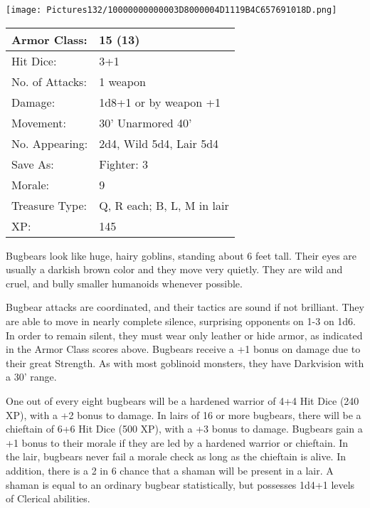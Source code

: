 \documentclass[a4paper,twoside,openany,10pt]{book}
\begin{document}
\begin{multicols}{2}
\begin{center}
\texttt{[image: Pictures132/10000000000003D8000004D1119B4C657691018D.png]}\medskip
\end{center}

\begin{center}
	\begin{tabularx}{0.48\textwidth}{@{}lX@{}}
Armor Class: & 15 (13) \\\hline
Hit Dice: & 3+1 \\\hline
No. of Attacks: & 1 weapon \\\hline
Damage: & 1d8+1 or by weapon +1 \\\hline
Movement: & 30' Unarmored 40' \\\hline
No. Appearing: & 2d4, Wild 5d4, Lair 5d4 \\\hline
Save As: & Fighter: 3 \\\hline
Morale: & 9 \\\hline
Treasure Type: & Q, R each; B, L, M in lair \\\hline
XP: & 145 \\\hline
\end{tabularx}\medskip
\end{center}

Bugbears look like huge, hairy goblins, standing about 6 feet tall. Their eyes are usually a darkish brown color and they move very quietly. They are wild and cruel, and bully smaller humanoids whenever possible. 

Bugbear attacks are coordinated, and their tactics are sound if not brilliant. They are able to move in nearly complete silence, surprising opponents on 1-3 on 1d6. In order to remain silent, they must wear only leather or hide armor, as indicated in the Armor Class scores above. Bugbears receive a +1 bonus on damage due to their great Strength. As with most goblinoid monsters, they have Darkvision with a 30' range.

One out of every eight bugbears will be a hardened warrior of 4+4 Hit Dice (240 XP), with a +2 bonus to damage. In lairs of 16 or more bugbears, there will be a chieftain of 6+6 Hit Dice (500 XP), with a +3 bonus to damage. Bugbears gain a +1 bonus to their morale if they are led by a hardened warrior or chieftain. In the lair, bugbears never fail a morale check as long as the chieftain is alive. In addition, there is a 2 in 6 chance that a shaman will be present in a lair. A shaman is equal to an ordinary bugbear statistically, but possesses 1d4+1 levels of Clerical abilities.\medskip




\end{multicols}
\end{document}
